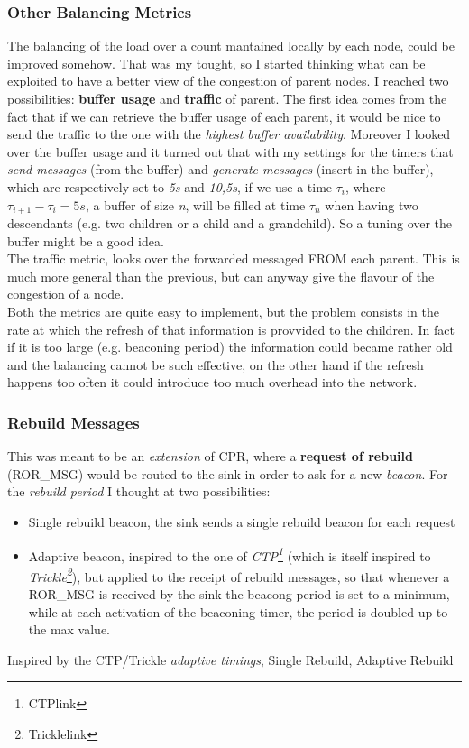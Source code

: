 \documentclass{article}
\begin{document}
\subsubsection{Other Balancing Metrics}
The balancing of the load over a count mantained locally by each node, could be improved somehow. That was my tought, so I started thinking what can be exploited to have a better view of the congestion of parent nodes. I reached two possibilities: \textbf{buffer usage} and \textbf{traffic} of parent. The first idea comes from the fact that if we can retrieve the buffer usage of each parent, it would be nice to send the traffic to the one with the \emph{highest buffer availability}. Moreover I looked over the buffer usage and it turned out that with my settings for the timers that \emph{send messages} (from the buffer) and \emph{generate messages} (insert in the buffer), which are respectively set to \textit{5s} and \textit{10,5s}, if we use a time $\tau_i$, where $\tau_{i+1}-\tau_{i}=5s$, a buffer of size \emph{n}, will be filled at time $\tau_n$ when having two descendants (e.g. two children or a child and a grandchild). So a tuning over the buffer might be a good idea.
\\ The traffic metric, looks over the forwarded messaged FROM each parent. This is much more general than the previous, but can anyway give the flavour of the congestion of a node.
\\Both the metrics are quite easy to implement, but the problem consists in the rate at which the refresh of that information is provvided to the children. In fact if it is too large (e.g. beaconing period) the information could became rather old and the balancing cannot be such effective, on the other hand if the refresh happens too often it could introduce too much overhead into the network.
\subsubsection{Rebuild Messages}
This was meant to be an \textit{extension} of CPR, where a \textbf{request of rebuild} (ROR\_MSG) would be routed to the sink in order to ask for a new \emph{beacon}. For the \textit{rebuild period} I thought at two possibilities:
\begin{itemize}
	\item Single rebuild beacon, the sink sends a single rebuild beacon for each request
	\item Adaptive beacon, inspired to the one of \emph{CTP\footnote{CTPlink}} (which is itself inspired to \emph{Trickle\footnote{Tricklelink}}), but applied to the receipt of rebuild messages, so that whenever a ROR\_MSG is received by the sink the beacong period is set to a minimum, while at each activation of the beaconing timer, the period is doubled up to the max value.
\end{itemize}
Inspired by the CTP/Trickle \textit{adaptive timings}, Single Rebuild, Adaptive Rebuild
\end{document}
